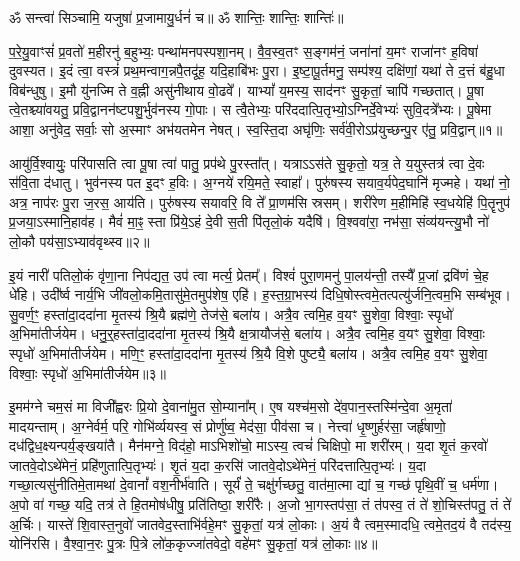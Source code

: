 \setcounter{anuvakam}{0}
ॐ सन्त्वा॑ सिञ्चामि॒ यजुषा॑ प्र॒जामायु॒र्धनं॑ च॥ ॐ शान्तिः॒ शान्तिः॒ शान्तिः॑॥

प॒रे॒यु॒वाꣳसं॑ प्र॒वतो॑ म॒हीरनु॑ ब॒हुभ्यः॒ पन्था॑मनपस्पशा॒नम्। 
वै॒व॒स्व॒तꣳ स॒ङ्गम॑नं॒ जना॑नां य॒मꣳ राजा॑नꣳ ह॒विषा॑ दुवस्यत। 
इ॒दं त्वा॒ वस्त्रं॑ प्रथ॒मन्वाग॒न्नपै॒तदू॑ह॒ यदि॒हाबि॑भः पु॒रा। 
इ॒ष्टा॒पू॒र्तमनु॒ सम्प॑श्य॒ दक्षि॑णां॒ यथा॑ ते द॒त्तं ब॑हु॒धा विब॑न्धुषु। 
इ॒मौ यु॑नज्मि ते व॒ह्नी असु॑नीथाय वो॒ढवे᳚। 
याभ्यां᳚ य॒मस्य॒ साद॑नꣳ सु॒कृतां॒ चापि॑ गच्छतात्। 
पू॒षा त्वे॒तश्च्या॑वयतु॒ प्रवि॒द्वानन॑ष्टपशु॒र्भुव॑नस्य गो॒पाः। 
स त्वै॒तेभ्यः॒ परि॑ददात्पि॒तृभ्यो॒ऽग्निर्दे॒वेभ्यः॑ सुवि॒दत्रे᳚भ्यः। 
पू॒षेमा आशा॒ अनु॑वेद॒ सर्वाः॒ सो अ॒स्माꣳ अभ॑यतमेन नेषत्। 
स्व॒स्ति॒दा अघृ॑णिः॒ सर्व॑वी॒रोऽप्र॑युच्छन्पु॒र ए॑तु॒ प्रवि॒द्वान्॥१॥

आयु॑र्वि॒श्वायुः॒ परि॑पासति त्वा पू॒षा त्वा॑ पातु॒ प्रप॑थे पु॒रस्ता᳚त्। 
यत्राऽऽस॑ते सु॒कृतो॒ यत्र॒ ते य॒युस्तत्र॑ त्वा दे॒वः स॑वि॒ता द॑धातु। 
भुव॑नस्य पत इ॒दꣳ ह॒विः। 
अ॒ग्नये॑ रयि॒मते॒ स्वाहा᳚। 
पुरु॑षस्य सयाव॒र्यपेद॒घानि॑ मृज्महे। 
यथा॑ नो॒ अत्र॒ नाप॑रः पु॒रा ज॒रस॒ आय॑ति। 
पुरु॑षस्य सयावरि॒ वि ते᳚ प्रा॒णम॑सि स्रसम्। 
शरी॑रेण म॒हीमिहि॑ स्व॒धयेहि॑ पि॒तॄनुप॑ प्र॒जया॒ऽस्मानि॒हाव॑ह। 
मैवं॑ मा॒ꣴ॒ स्ता प्रि॑ये॒ऽहं दे॒वी स॒ती पि॑तृलो॒कं यदैषि॑। 
वि॒श्ववा॑रा॒ नभ॑सा॒ संव्य॑यन्त्यु॒भौ नो॑ लो॒कौ पय॑सा॒ऽभ्याव॑वृथ्स्व॥२॥

इ॒यं नारी॑ पतिलो॒कं वृ॑णा॒ना निप॑द्यत॒ उप॑ त्वा मर्त्य॒ प्रेतम्᳚। 
विश्वं॑ पुरा॒णमनु॑ पा॒लय॑न्ती॒ तस्यै᳚ प्र॒जां द्रवि॑णं चे॒ह धे॑हि। 
उदी᳚र्ष्व नार्य॒भि जी॑वलो॒कमि॒तासु॑मे॒तमुप॑शेष॒ एहि॑। 
ह॒स्त॒ग्रा॒भस्य॑ दिधि॒षोस्त्वमे॒तत्पत्यु॑र्जनि॒त्वम॒भि सम्ब॑भूव। 
सु॒वर्ण॒ꣳ॒ हस्ता॑दा॒ददा॑ना मृ॒तस्य॑ श्रि॒यै ब्रह्म॑णे॒ तेज॑से॒ बला॑य। 
अत्रै॒व त्वमि॒ह व॒यꣳ सु॒शेवा॒ विश्वाः॒ स्पृधो॑ अ॒भिमा॑तीर्जयेम। 
धनु॒र्॒\mbox{}हस्ता॑दा॒ददा॑ना मृ॒तस्य॑ श्रि॒यै क्ष॒त्रायौज॑से॒ बला॑य। 
अत्रै॒व त्वमि॒ह व॒यꣳ सु॒शेवा॒ विश्वाः॒ स्पृधो॑ अ॒भिमा॑तीर्जयेम। 
मणि॒ꣳ॒ हस्ता॑दा॒ददा॑ना मृ॒तस्य॑ श्रि॒यै वि॒शे पुष्ट्यै॒ बला॑य। 
अत्रै॒व त्वमि॒ह व॒यꣳ सु॒शेवा॒ विश्वाः॒ स्पृधो॑ अ॒भिमा॑तीर्जयेम॥३॥

इ॒मम॑ग्ने चम॒सं मा विजी᳚ह्वरः प्रि॒यो दे॒वाना॑मु॒त सो॒म्याना᳚म्। 
ए॒ष यश्च॑म॒सो दे॑व॒पान॒स्तस्मि॑न्दे॒वा अ॒मृता॑ मादयन्ताम्। 
अ॒ग्नेर्वर्म॒ परि॒ गोभि॑र्व्ययस्व॒ सं प्रोर्णु॑ष्व॒ मेद॑सा॒ पीव॑सा च। 
नेत्त्वा॑ धृ॒ष्णुर्\mbox{}हर॑सा॒ जर्\mbox{}हृ॑षाणो॒ दध॑द्विध॒क्ष्यन्पर्य॒ङ्खया॑तै। 
मैन॑मग्ने॒ विद॑हो॒ माऽभिशो॑चो॒ माऽस्य॒ त्वचं॑ चिक्षिपो॒ मा शरी॑रम्। 
य॒दा शृ॒तं क॒रवो॑ जातवे॒दोऽथे॑मेनं॒ प्रहि॑णुतात्पि॒तृभ्यः॑। 
शृ॒तं य॒दा क॒रसि॑ जातवे॒दोऽथे॑मेनं॒ परि॑दत्तात्पि॒तृभ्यः॑। 
य॒दा गच्छा॒त्यसु॑नीतिमे॒तामथा॑ दे॒वानां᳚ वश॒नीर्भ॑वाति। 
सूर्यं॑ ते॒ चक्षु॑र्गच्छतु॒ वात॑मा॒त्मा द्यां च॒ गच्छ॑ पृथि॒वीं च॒ धर्म॑णा। 
अ॒पो वा॑ गच्छ॒ यदि॒ तत्र॑ ते हि॒तमोष॑धीषु॒ प्रति॑तिष्ठा॒ शरी॑रैः। 
अ॒जो भा॒गस्तप॑सा॒ तं त॑पस्व॒ तं ते॑ शो॒चिस्त॑पतु॒ तं ते॑ अ॒र्चिः। 
यास्ते॑ शि॒वास्त॒नुवो॑ जातवेद॒स्ताभि॑र्वहे॒मꣳ सु॒कृतां॒ यत्र॑ लो॒काः। 
अ॒यं वै त्वम॒स्मादधि॒ त्वमे॒तद॒यं वै तद॑स्य॒ योनि॑रसि। 
वै॒श्वा॒न॒रः पु॒त्रः पि॒त्रे लो॑क॒कृज्जा॑तवेदो॒ वहे॑मꣳ सु॒कृतां॒ यत्र॑ लो॒काः॥४॥
\anuvakamend[वि॒द्वान॒भ्याव॑वृथ्स्वा॒भिमा॑तीर्जयेम॒ शरी॑रैश्च॒त्वारि॑ च]

